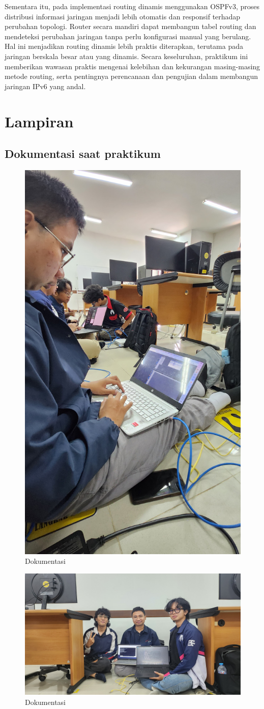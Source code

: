 Sementara itu, pada implementasi routing dinamis menggunakan OSPFv3, proses distribusi informasi jaringan menjadi lebih otomatis dan responsif terhadap perubahan topologi. Router secara mandiri dapat membangun tabel routing dan mendeteksi perubahan jaringan tanpa perlu konfigurasi manual yang berulang. Hal ini menjadikan routing dinamis lebih praktis diterapkan, terutama pada jaringan berskala besar atau yang dinamis. Secara keseluruhan, praktikum ini memberikan wawasan praktis mengenai kelebihan dan kekurangan masing-masing metode routing, serta pentingnya perencanaan dan pengujian dalam membangun jaringan IPv6 yang andal.


\section{Lampiran}
\subsection{Dokumentasi saat praktikum}
\begin{figure}[H]
        \centering
        \includegraphics[width=0.5\linewidth]{P1/gambar10.jpeg}
        \caption{Dokumentasi}
        \label{fig:gambar1}
    \end{figure}

    \begin{figure}[H]
        \centering
        \includegraphics[width=0.5\linewidth]{P1/gambar8.jpeg}
        \caption{Dokumentasi}
        \label{fig:gambar1}
    \end{figure}

